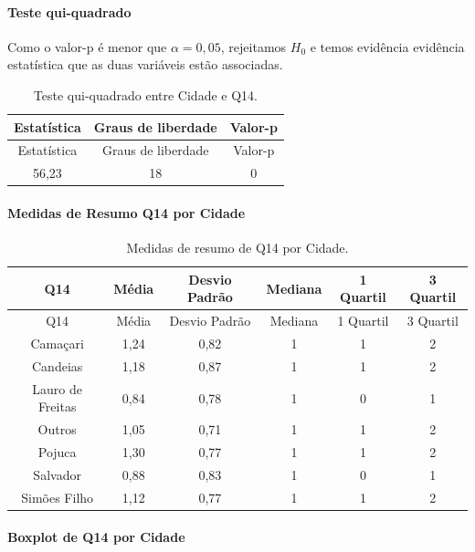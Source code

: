 \documentclass[]{article}
\let\oldparagraph\paragraph
\renewcommand{\paragraph}[1]{\oldparagraph{#1}\mbox{}}
\begin{document}
\hypertarget{teste-qui-quadrado-2}{%
\paragraph{Teste qui-quadrado}\label{teste-qui-quadrado-2}}

Como o valor-p é menor que \(\alpha=0,05\), rejeitamos \(H_0\) e temos evidência evidência estatística que as duas variáveis estão associadas.

\begin{longtable}[]{@{}ccc@{}}
\caption{\label{tab:unnamed-chunk-62}Teste qui-quadrado entre Cidade e Q14.}\tabularnewline
\toprule
Estatística & Graus de liberdade & Valor-p\tabularnewline
\midrule
\endfirsthead
\toprule
Estatística & Graus de liberdade & Valor-p\tabularnewline
\midrule
\endhead
56,23 & 18 & 0\tabularnewline
\bottomrule
\end{longtable}

\cleardoublepage

\hypertarget{medidas-de-resumo-q14-por-cidade}{%
\paragraph{Medidas de Resumo Q14 por Cidade}\label{medidas-de-resumo-q14-por-cidade}}

\begin{longtable}[]{@{}cccccc@{}}
\caption{\label{tab:unnamed-chunk-63}Medidas de resumo de Q14 por Cidade.}\tabularnewline
\toprule
Q14 & Média & Desvio Padrão & Mediana & 1 Quartil & 3 Quartil\tabularnewline
\midrule
\endfirsthead
\toprule
Q14 & Média & Desvio Padrão & Mediana & 1 Quartil & 3 Quartil\tabularnewline
\midrule
\endhead
Camaçari & 1,24 & 0,82 & 1 & 1 & 2\tabularnewline
Candeias & 1,18 & 0,87 & 1 & 1 & 2\tabularnewline
Lauro de Freitas & 0,84 & 0,78 & 1 & 0 & 1\tabularnewline
Outros & 1,05 & 0,71 & 1 & 1 & 2\tabularnewline
Pojuca & 1,30 & 0,77 & 1 & 1 & 2\tabularnewline
Salvador & 0,88 & 0,83 & 1 & 0 & 1\tabularnewline
Simões Filho & 1,12 & 0,77 & 1 & 1 & 2\tabularnewline
\bottomrule
\end{longtable}

\hypertarget{boxplot-de-q14-por-cidade}{%
\paragraph{Boxplot de Q14 por Cidade}\label{boxplot-de-q14-por-cidade}}
\end{document}
